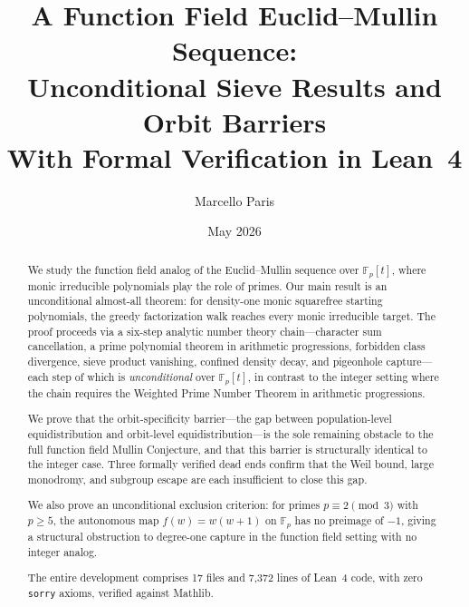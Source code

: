 \documentclass[11pt,a4paper]{article}
\title{A Function Field Euclid--Mullin Sequence: \\
  Unconditional Sieve Results and Orbit Barriers \\[6pt]
  \large With Formal Verification in Lean~4}
\author{Marcello Paris}
\date{May 2026}
\theoremstyle{plain}
\theoremstyle{definition}
\theoremstyle{remark}
\newcommand{\Fp}{\mathbb{F}_p}
\newcommand{\Fpt}{\mathbb{F}_p[t]}
\begin{document}
\maketitle

\begin{abstract}
We study the function field analog of the Euclid--Mullin sequence over
$\Fpt$, where monic irreducible polynomials play the role of primes.
Our main result is an unconditional almost-all theorem: for density-one
monic squarefree starting polynomials, the greedy factorization walk
reaches every monic irreducible target.
The proof proceeds via a six-step analytic number theory chain---character
sum cancellation, a prime polynomial theorem in arithmetic progressions,
forbidden class divergence, sieve product vanishing, confined density decay,
and pigeonhole capture---each step of which is \emph{unconditional} over
$\Fpt$, in contrast to the integer setting where the chain requires the
Weighted Prime Number Theorem in arithmetic progressions.

We prove that the orbit-specificity barrier---the gap between population-level
equidistribution and orbit-level equidistribution---is the sole remaining
obstacle to the full function field Mullin Conjecture, and that this barrier
is structurally identical to the integer case. Three formally verified dead
ends confirm that the Weil bound, large monodromy, and subgroup escape are
each insufficient to close this gap.

We also prove an unconditional exclusion criterion: for primes $p \equiv 2
\pmod{3}$ with $p \geq 5$, the autonomous map $f(w) = w(w+1)$ on $\Fp$ has
no preimage of $-1$, giving a structural obstruction to degree-one capture
in the function field setting with no integer analog.

The entire development comprises 17 files and 7{,}372 lines of Lean~4 code,
with zero \texttt{sorry} axioms, verified against Mathlib.
\end{abstract}

\tableofcontents

\newpage











\end{document}
